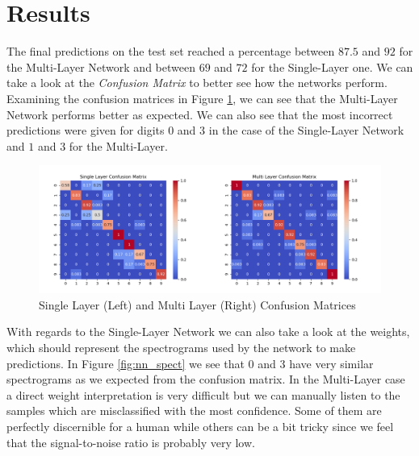 \documentclass[10pt,a4paper]{report}
\begin{document}
\section{Results}
The final predictions on the test set reached a percentage between $87.5$ and $92$ for the Multi-Layer Network and between $69$ and $72$ for the Single-Layer one. We can take a look at the \textit{Confusion Matrix} to better see how the networks perform. Examining the confusion matrices in Figure \ref{fig:conf_mat}, we can see that the Multi-Layer Network performs better as expected. We can also see that the most incorrect predictions were given for digits $0$ and $3$ in the case of the Single-Layer Network and $1$ and $3$ for the Multi-Layer. 
\begin{figure}[!ht]
\centering
\includegraphics[width=\linewidth]{conf_mat.png}
\caption{Single Layer (Left) and Multi Layer (Right) Confusion Matrices}
\label{fig:conf_mat}
\end{figure}
With regards to the Single-Layer Network we can also take a look at the weights, which should represent the spectrograms used by the network to make predictions. In Figure \ref{fig:nn_spect} we see that $0$ and $3$ have very similar spectrograms as we expected from the confusion matrix. In the Multi-Layer case a direct weight interpretation is very difficult but we can manually listen to the samples which are misclassified with the most confidence. Some of them are perfectly discernible for a human while others can be a bit tricky since we feel that the signal-to-noise ratio is probably very low.
\end{document}
